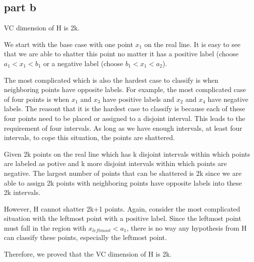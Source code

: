 \subsection{part b}
VC dimension of H is 2k.

We start with the base case with one point $x_1$ on the real line. It is easy to see that we are able to shatter this point no matter it has a positive label (choose $a_1<x_1<b_1$ or a negative label (choose $b_1<x_1<a_2$).

The most complicated which is also the hardest case to classify is when neighboring points have opposite labels. For example, the most complicated case of four points is when $x_1$ and $x_3$ have positive labels and $x_2$ and $x_4$ have negative labels. The reasont that it is the hardest case to classify is because each of these four points need to be placed or assigned to a disjoint interval. This leads to the requirement of four intervals. As long as we have enough intervals, at least four intervals, to cope this situation, the points are shattered.

Given 2k points on the real line which has k disjoint intervals within which points are labeled as potive and k more disjoint intervals within which points are negative. The largest number of points that can be shattered is 2k since we are able to assign 2k points with neighboring points have opposite labels into these 2k intervals.

However, H cannot shatter 2k+1 points. Again, consider the most complicated situation with the leftmost point with a positive label. Since the leftmost point must fall in the region with $x_{leftmost}<a_1$, there is no way any hypothesis from H can classify these points, especially the leftmost point.

Therefore, we proved that the VC dimension of H is 2k.







